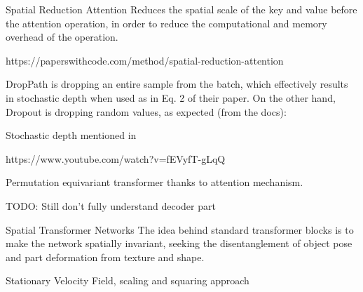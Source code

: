 Spatial Reduction Attention
Reduces the spatial scale of the key and value before the attention operation, in order to reduce the computational and memory overhead of the operation.

https://paperswithcode.com/method/spatial-reduction-attention

DropPath is dropping an entire sample from the batch, which effectively results in stochastic depth when used as in Eq. 2 of their paper. On the other hand, Dropout is dropping random values, as expected (from the docs):

Stochastic depth mentioned in \cite{Huang2016-np}

https://www.youtube.com/watch?v=fEVyfT-gLqQ


Permutation equivariant transformer thanks to attention mechanism.

TODO: Still don't fully understand decoder part

Spatial Transformer Networks \cite{Jaderberg2015-kg}
The idea behind standard transformer blocks is to make the network spatially invariant, seeking the disentanglement of object pose and part deformation from texture and shape.

Stationary Velocity Field, scaling and squaring approach


